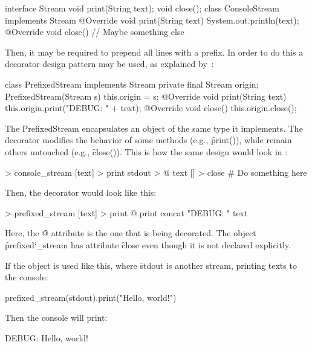 \begin{eocode}
interface Stream {
  void print(String text);
  void close();
}
class ConsoleStream implements Stream {
  @Override
  void print(String text) {
    System.out.println(text);
  }
  @Override
  void close() {
    // Maybe something else
  }
}
\end{eocode}

Then, it may be required to prepend all lines with a prefix. In order
to do this a decorator design pattern may be used,
as explained by~\citet[p.196]{gamma1994design}:

\begin{eocode}
class PrefixedStream implements Stream {
  private final Stream origin;
  PrefixedStream(Stream s) {
    this.origin = s;
  }
  @Override
  void print(String text) {
    this.origin.print("DEBUG: " + text);
  }
  @Override
  void close() {
    this.origin.close();
  }
}
\end{eocode}

The \f{PrefixedStream} encapsulates an object of the same type it
implements. The decorator modifies the behavior of some methods (e.g., \f{print()}), while
remain others untouched (e.g., \f{close()}). This is how the same design
would look in \eo{}:

\begin{eocode}
[] > console_stream
  [text] > print
    stdout > @
      text
  [] > close
    # Do something here
\end{eocode}

Then, the decorator would look like this:

\begin{eocode}
[@] > prefixed_stream
  [text] > print
    @.print
      concat
        "DEBUG: "
        text
\end{eocode}

Here, the \f{@} attribute is the one that is being decorated.
The object \f{prefixed\char`_stream} has attribute \f{close} even
though it is not declared explicitly.

If the object is used like this, where \f{stdout} is another stream,
printing texts to the console:

\begin{eocode}
prefixed_stream(stdout).print("Hello, world!")
\end{eocode}

Then the console will print:

\begin{eocode}
DEBUG: Hello, world!
\end{eocode}


